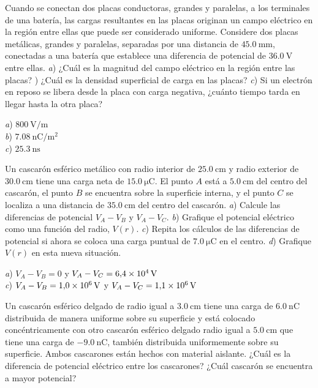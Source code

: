 %
\begin{Exercise}
  Cuando se conectan dos placas conductoras, grandes y paralelas, a los terminales de una batería, las cargas resultantes en las placas originan un campo eléctrico en la región entre ellas que puede ser considerado uniforme. Considere dos placas metálicas, grandes y paralelas, separadas por una distancia de $\SI{45.0}{\milli\metre}$, conectadas a una batería que establece una diferencia de potencial de $\SI{36.0}{\volt}$ entre ellas. \textit{a}) ¿Cuál es la magnitud del campo eléctrico en la región entre las placas? ) ¿Cuál es la densidad superficial de carga en las placas? \textit{c}) Si un electrón en reposo se libera desde la placa con carga negativa, ¿cuánto tiempo tarda en llegar hasta la otra placa?
\end{Exercise}
\begin{Answer}
	\begin{minipage}[t]{.4\textwidth}
    \textit{a}) $\SI{800}{\volt/\metre}$\\ \textit{b}) $\SI{7.08}{\nano\coulomb/\metre\squared}$\\ \textit{c}) $\SI{25.3}{\nano\second}$
  \end{minipage}
\end{Answer}
%
\begin{Exercise}
  Un cascarón esférico metálico con radio interior de $\SI{25.0}{\centi\metre}$ y radio exterior de $\SI{30.0}{\centi\metre}$ tiene una carga neta de $\SI{15.0}{\micro\coulomb}$. El punto $A$ está a $\SI{5.0}{\centi\metre}$ del centro del cascarón, el punto $B$ se encuentra sobre la superficie interna, y el punto $C$ se localiza a una distancia de $\SI{35.0}{\centi\metre}$ del centro del cascarón. \textit{a}) Calcule las diferencias de potencial $V_A-V_B$ y $V_A-V_C$. \textit{b}) Grafique el potencial eléctrico como una función del radio, $V(r)$. \textit{c}) Repita los cálculos de las diferencias de potencial si ahora se coloca una carga puntual de $\SI{7.0}{\micro\coulomb}$ en el centro. \textit{d}) Grafique $V(r)$ en esta nueva situación.
\end{Exercise}
\begin{Answer}
	\begin{minipage}[t]{.4\textwidth}
    \textit{a}) $V_A-V_B = 0$ y $V_A-V_C = \SI{6.4E4}{\volt}$\\ \textit{c}) $V_A-V_B = \SI{1.0E6}{\volt}$ y $V_A-V_C = \SI{1.1E6}{\volt}$
  \end{minipage}
\end{Answer}
%
\begin{Exercise}
  Un cascarón esférico delgado de radio igual a $\SI{3.0}{\centi\metre}$ tiene una carga de $\SI{6.0}{\nano\coulomb}$ distribuida de manera uniforme sobre su superficie y está colocado concéntricamente con otro cascarón esférico delgado radio igual a $\SI{5.0}{\centi\metre}$ que tiene una carga de $\SI{-9.0}{\nano\coulomb}$, también distribuida uniformemente sobre su superficie. Ambos cascarones están hechos con material aislante. ¿Cuál es la diferencia de potencial eléctrico entre los cascarones? ¿Cuál cascarón se encuentra a mayor potencial?
\end{Exercise}
